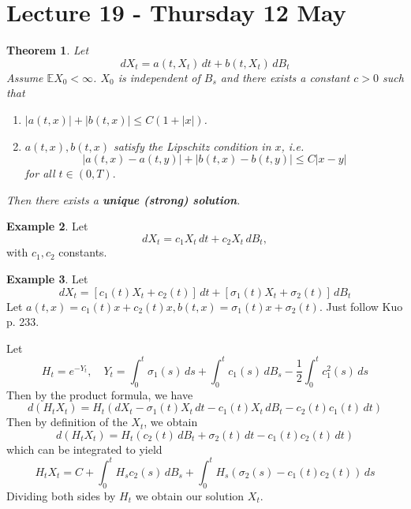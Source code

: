 \documentclass[10pt, oneside, reqno]{amsart}
\theoremstyle{plain}%
\newtheorem{thm}{Theorem}[section]
\theoremstyle{definition}
\newtheorem{exmp}[thm]{Example}
\theoremstyle{remark}
\newcommand{\E}{\mathbb{E}}
\begin{document}
\section{Lecture 19 - Thursday 12 May} %
\label{sec:lecture_19_thursday_12_may}

\begin{thm}
	Let \[
		dX_t = a(t, X_t) \, dt + b(t, X_t) \, dB_t
	\]
	Assume $\E X_0 < \infty$.  $X_0$ is independent of $B_s$ and there exists a constant $c > 0$ such that \begin{enumerate}
		\item $|a(t, x)| + |b(t, x)| \leq C(1 + |x|)$.  
		\item $a(t, x), b(t, x)$ satisfy the Lipschitz condition in $x$, i.e.\[
			|a(t,x)- a(t, y)| + |b(t, x) - b(t, y)| \leq C|x - y|
		\] for all $t \in (0, T).  $
	\end{enumerate}  Then there exists a \textbf{unique (strong) solution}. 
\end{thm}

\begin{exmp}
	Let \[
		dX_t = c_1 X_t \, dt + c_2 X_t \, dB_t,
	\] with $c_1, c_2$ constants.  
\end{exmp}

\begin{exmp}
	Let \[
		dX_t = [ c_1(t) X_t + c_2(t)] \, dt + [ \sigma_1(t) X_t + \sigma_2(t)] \, dB_t
	\]  Let $a(t,x) = c_1(t)x  + c_2(t)x, b(t,x) = \sigma_1(t) x + \sigma_2(t)$.  
		Just follow Kuo p. 233.
		
		Let \[
			H_t = e^{-Y_t}, \quad Y_t = \int_0^t \sigma_1(s) \, ds + \int_0^t c_1(s) \, dB_s - \frac{1}{2} \int_0^t c^2_1(s) \, ds
		\]   Then by the \ito product formula, we have \[
			d(H_t X_t) = H_t \left( dX_t - \sigma_1(t) X_t \, dt - c_1(t) X_t \, dB_t - c_2(t) c_1(t) \, dt \right)
		\] Then by definition of the $X_t$, we obtain \[
			d(H_t X_t) = H_t \left( c_2(t) \, dB_t + \sigma_2(t) \, dt - c_1(t) c_2(t) \, dt \right)
		\] which can be integrated to yield \[
			H_t X_t = C + \int_0^t H_s c_2(s) \, dB_s + \int_0^t H_s(\sigma_2(s) - c_1(t) c_2(t)) \, ds
		\] Dividing both sides by $H_t$ we obtain our solution $X_t$.  
\end{exmp}
\end{document}

